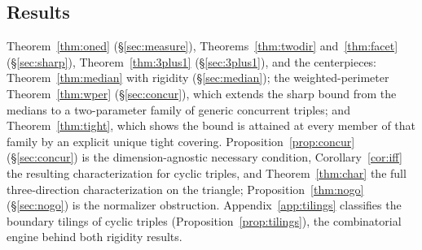 \documentclass[11pt,reqno]{amsart}
\theoremstyle{plain}
\theoremstyle{definition}
\theoremstyle{remark}
\begin{document}
\subsection*{Results}
Theorem~\ref{thm:oned} (\S\ref{sec:measure}), Theorems~\ref{thm:twodir}
and~\ref{thm:facet} (\S\ref{sec:sharp}), Theorem~\ref{thm:3plus1}
(\S\ref{sec:3plus1}), and the centerpieces: Theorem~\ref{thm:median} with rigidity
(\S\ref{sec:median}); the weighted-perimeter Theorem~\ref{thm:wper}
(\S\ref{sec:concur}), which extends the sharp bound from the medians to a
two-parameter family of generic concurrent triples; and
Theorem~\ref{thm:tight}, which shows the bound is attained at every member of
that family by an explicit unique tight covering.
Proposition~\ref{prop:concur} (\S\ref{sec:concur}) is the dimension-agnostic
necessary condition, Corollary~\ref{cor:iff} the resulting characterization for
cyclic triples, and Theorem~\ref{thm:char} the full three-direction
characterization on the triangle; Proposition~\ref{thm:nogo} (\S\ref{sec:nogo})
is the normalizer obstruction. Appendix~\ref{app:tilings} classifies the
boundary tilings of cyclic triples (Proposition~\ref{prop:tilings}), the
combinatorial engine behind both rigidity results.
\end{document}
